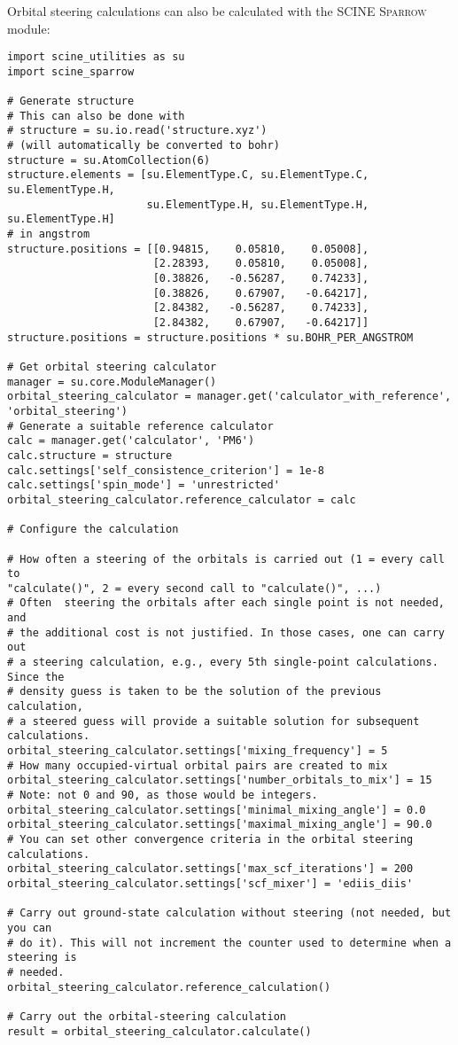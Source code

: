 \documentclass[]{tufte-book}
\begin{document}
Orbital steering calculations can also be calculated with the SCINE \textsc{Sparrow} module:
\begin{verbatim}
import scine_utilities as su
import scine_sparrow

# Generate structure
# This can also be done with 
# structure = su.io.read('structure.xyz')
# (will automatically be converted to bohr)
structure = su.AtomCollection(6)
structure.elements = [su.ElementType.C, su.ElementType.C, su.ElementType.H, 
                      su.ElementType.H, su.ElementType.H, su.ElementType.H]
# in angstrom                                                                
structure.positions = [[0.94815,    0.05810,    0.05008], 
                       [2.28393,    0.05810,    0.05008],       
                       [0.38826,   -0.56287,    0.74233],       
                       [0.38826,    0.67907,   -0.64217],       
                       [2.84382,   -0.56287,    0.74233],       
                       [2.84382,    0.67907,   -0.64217]]
structure.positions = structure.positions * su.BOHR_PER_ANGSTROM

# Get orbital steering calculator
manager = su.core.ModuleManager()
orbital_steering_calculator = manager.get('calculator_with_reference',
'orbital_steering')
# Generate a suitable reference calculator
calc = manager.get('calculator', 'PM6')
calc.structure = structure
calc.settings['self_consistence_criterion'] = 1e-8
calc.settings['spin_mode'] = 'unrestricted'
orbital_steering_calculator.reference_calculator = calc

# Configure the calculation

# How often a steering of the orbitals is carried out (1 = every call to
"calculate()", 2 = every second call to "calculate()", ...)
# Often  steering the orbitals after each single point is not needed, and
# the additional cost is not justified. In those cases, one can carry out
# a steering calculation, e.g., every 5th single-point calculations. Since the
# density guess is taken to be the solution of the previous calculation, 
# a steered guess will provide a suitable solution for subsequent calculations.
orbital_steering_calculator.settings['mixing_frequency'] = 5
# How many occupied-virtual orbital pairs are created to mix
orbital_steering_calculator.settings['number_orbitals_to_mix'] = 15
# Note: not 0 and 90, as those would be integers.
orbital_steering_calculator.settings['minimal_mixing_angle'] = 0.0
orbital_steering_calculator.settings['maximal_mixing_angle'] = 90.0
# You can set other convergence criteria in the orbital steering calculations.
orbital_steering_calculator.settings['max_scf_iterations'] = 200 
orbital_steering_calculator.settings['scf_mixer'] = 'ediis_diis'

# Carry out ground-state calculation without steering (not needed, but you can
# do it). This will not increment the counter used to determine when a steering is
# needed.
orbital_steering_calculator.reference_calculation()

# Carry out the orbital-steering calculation
result = orbital_steering_calculator.calculate()

\end{verbatim}
\end{document}
